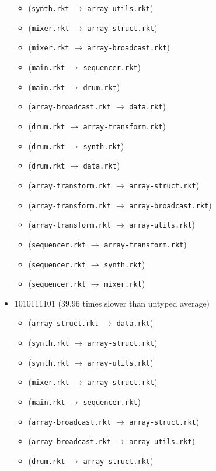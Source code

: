 \documentclass{article}
\newcommand{\mono}[1]{\texttt{#1}}
\begin{document}
\begin{itemize}
\begin{itemize}
  \item (\mono{synth.rkt} $\rightarrow$ \mono{array-utils.rkt})
  \item (\mono{mixer.rkt} $\rightarrow$ \mono{array-struct.rkt})
  \item (\mono{mixer.rkt} $\rightarrow$ \mono{array-broadcast.rkt})
  \item (\mono{main.rkt} $\rightarrow$ \mono{sequencer.rkt})
  \item (\mono{main.rkt} $\rightarrow$ \mono{drum.rkt})
  \item (\mono{array-broadcast.rkt} $\rightarrow$ \mono{data.rkt})
  \item (\mono{drum.rkt} $\rightarrow$ \mono{array-transform.rkt})
  \item (\mono{drum.rkt} $\rightarrow$ \mono{synth.rkt})
  \item (\mono{drum.rkt} $\rightarrow$ \mono{data.rkt})
  \item (\mono{array-transform.rkt} $\rightarrow$ \mono{array-struct.rkt})
  \item (\mono{array-transform.rkt} $\rightarrow$ \mono{array-broadcast.rkt})
  \item (\mono{array-transform.rkt} $\rightarrow$ \mono{array-utils.rkt})
  \item (\mono{sequencer.rkt} $\rightarrow$ \mono{array-transform.rkt})
  \item (\mono{sequencer.rkt} $\rightarrow$ \mono{synth.rkt})
  \item (\mono{sequencer.rkt} $\rightarrow$ \mono{mixer.rkt})
  \end{itemize}
\item 1010111101 (39.96 times slower than untyped average)
  \begin{itemize}
  \item (\mono{array-struct.rkt} $\rightarrow$ \mono{data.rkt})
  \item (\mono{synth.rkt} $\rightarrow$ \mono{array-struct.rkt})
  \item (\mono{synth.rkt} $\rightarrow$ \mono{array-utils.rkt})
  \item (\mono{mixer.rkt} $\rightarrow$ \mono{array-struct.rkt})
  \item (\mono{main.rkt} $\rightarrow$ \mono{sequencer.rkt})
  \item (\mono{array-broadcast.rkt} $\rightarrow$ \mono{array-struct.rkt})
  \item (\mono{array-broadcast.rkt} $\rightarrow$ \mono{array-utils.rkt})
  \item (\mono{drum.rkt} $\rightarrow$ \mono{array-struct.rkt})

\end{itemize}
\end{itemize}
\end{document}
